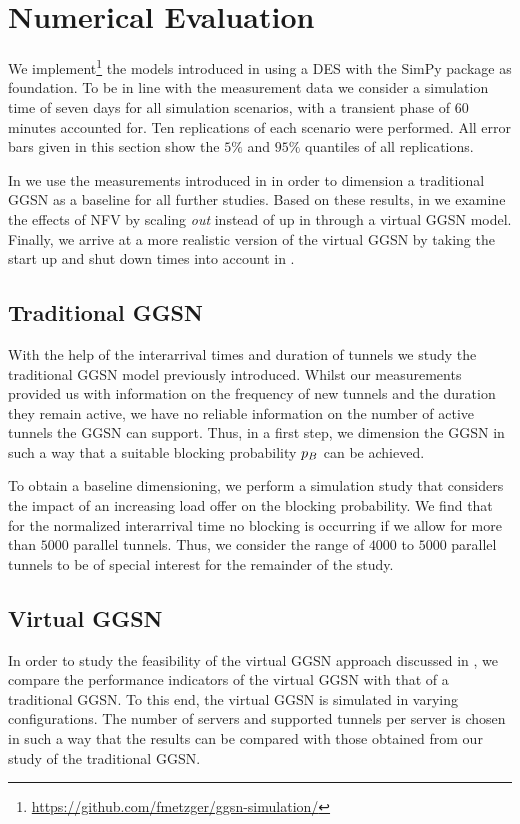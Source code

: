 \section{Numerical Evaluation}
\label{sec:numerical}
We implement\footnote{\url{https://github.com/fmetzger/ggsn-simulation/}} the models introduced in  using a \gls{DES} with the SimPy \cite{simpy} package as foundation.
To be in line with the measurement data we consider a simulation time of seven days for all simulation scenarios, with a transient phase of 60 minutes accounted for. Ten replications of each scenario were performed.
All error bars given in this section show the $5\%$ and $95\%$ quantiles of all replications.

In  we use the measurements introduced in  in order to dimension a traditional \gls{GGSN} as a baseline for all further studies.
Based on these results, in  we examine the effects of \gls{NFV} by scaling \emph{out} instead of up in  through a virtual \gls{GGSN} model. Finally, we arrive at a more realistic version of the virtual \gls{GGSN} by taking the start up and shut down times into account in .

\subsection{Traditional GGSN}
\label{sec:eval_traditional_ggsn}
With the help of the interarrival times and duration of tunnels we study the traditional \gls{GGSN} model previously introduced.
Whilst our measurements provided us with information on the frequency of new tunnels and the duration they remain active, we have no reliable information on the number of active tunnels the \gls{GGSN} can support. Thus, in a first step, we dimension the \gls{GGSN} in such a way that a suitable blocking probability $p_B$ can be achieved.

To obtain a baseline dimensioning, we perform a simulation study that considers the impact of an increasing load offer on the blocking probability.
We find that for the normalized interarrival time no blocking is occurring if we allow for more than $5000$ parallel tunnels.
Thus, we consider the range of $4000$ to $5000$ parallel tunnels to be of special interest for the remainder of the study.

\subsection{Virtual \gls{GGSN}}
\label{sec:eval_ideal_virtual_ggsn}
In order to study the feasibility of the virtual \gls{GGSN} approach discussed in , we compare the performance indicators of the virtual \gls{GGSN} with that of a traditional \gls{GGSN}.
To this end, the virtual \gls{GGSN} is simulated in varying configurations.
The number of servers and supported tunnels per server is chosen in such a way that the results can be compared with those obtained from our study of the traditional \gls{GGSN}.

